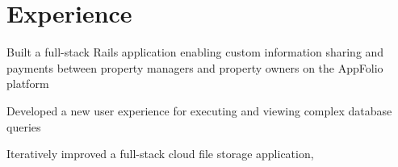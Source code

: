 \section{Experience}

\begin{tightemize}
\item Built a full-stack Rails application enabling custom information sharing and payments between property managers and property owners on the AppFolio platform
\item Developed a new user experience for executing and viewing complex database queries
\end{tightemize}
\sectionsep

\begin{tightemize}
\item Iteratively improved a full-stack cloud file storage application, 
\item {}
\end{tightemize}
\sectionsep
